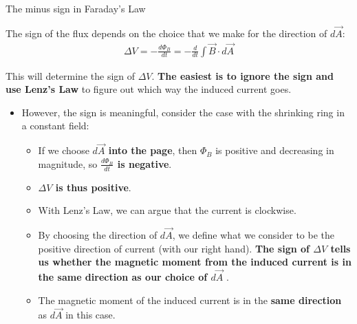 \documentclass[aspectratio=169,
hyperref={colorlinks,urlcolor=blue}
]{beamer}
\begin{document}
\begin{bulletframe}{The minus sign in Faraday's Law}
\item The sign of the flux depends on the choice that we make for the direction of $d\vec A$:
\begin{align*}
\Delta V = -\frac{d\Phi_B}{dt} = -\frac{d}{dt}\int \vec B \cdot d\vec A
\end{align*}
\item This will determine the sign of $\Delta V$. \textbf{The easiest is to ignore the sign and use Lenz’s Law} to figure out which way the induced current goes.
\end{bulletframe}


{
\begin{itemize}
\item However, the sign is meaningful, consider the case with the shrinking ring in a constant field:
\begin{itemize}
\item If we choose \textbf{$d\vec A$ into the page}, then $\Phi_B$ is positive and decreasing in magnitude, so \textbf{$\frac{d\Phi_B}{dt} $ is negative}.
\item \textbf{\color{qred}$\Delta V$ is thus positive}. 
\item With Lenz’s Law, we can argue that the current is clockwise. 
\item By choosing the direction of $d\vec A$, we define what we consider to be the positive direction of current (with our right hand). \textbf{The sign of $\Delta V$ tells us whether the magnetic moment from the induced current is in the same direction as our choice of $d\vec A$ }.
\item The magnetic moment of the induced current is in the \textbf{\color{qred}same direction} as $d\vec A$ in this case.
\end{itemize}
\end{itemize}
}
\end{document}
